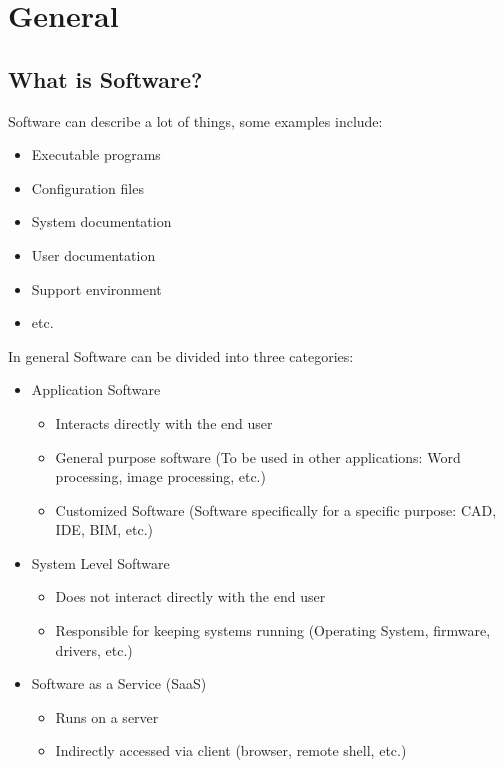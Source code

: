 \documentclass[
../../Software_Engineering_Summary.tex,
]
{subfiles}
\begin{document}
\section{General}
\subsection{What is Software?}
Software can describe a lot of things, some examples include:

\begin{defbox*}
    \begin{itemize}
        \item Executable programs
        \item Configuration files
        \item System documentation
        \item User documentation
        \item Support environment
        \item etc.
    \end{itemize}
\end{defbox*}

In general Software can be divided into three categories:

\begin{defbox*}
        \begin{itemize}
        \item{Application Software}
        \begin{itemize}
            \item Interacts directly with the end user
            \item General purpose software (To be used in other applications: Word processing, image processing, etc.)
            \item Customized Software (Software specifically for a specific purpose: CAD, IDE, BIM, etc.)
        \end{itemize}
        \item System Level Software
        \begin{itemize}
            \item Does not interact directly with the end user
            \item Responsible for keeping systems running (Operating System, firmware, drivers, etc.)
        \end{itemize}
        \item Software as a Service (SaaS)
        \begin{itemize}
            \item Runs on a server
            \item Indirectly accessed via client (browser, remote shell, etc.)
        \end{itemize}
    \end{itemize}
\end{defbox*}
\end{document}

